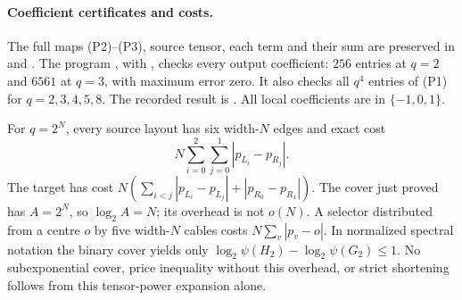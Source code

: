 \paragraph{Coefficient certificates and costs.}
The full maps (P2)--(P3), source tensor, each term and
their sum are preserved in
and .
The program ,
with ,
checks every output coefficient: $256$ entries at $q=2$
and $6561$ at $q=3$, with maximum error zero.
It also checks all $q^4$ entries of (P1) for
$q=2,3,4,5,8$.  The recorded result is
.
All local coefficients are in $\{-1,0,1\}$.

For $q=2^N$, every source layout has six width-$N$
edges and exact cost
\[
 N\sum_{i=0}^2\sum_{j=0}^1|p_{L_i}-p_{R_j}|.
\]
The target has cost
$N(\sum_{i<j}|p_{L_i}-p_{L_j}|+|p_{R_0}-p_{R_1}|)$.
The cover just proved has $A=2^N$, so $\log_2A=N$;
its overhead is not $o(N)$.  A selector distributed
from a centre $o$ by five width-$N$ cables costs
$N\sum_v|p_v-o|$.  In normalized spectral notation
the binary cover yields only
$\log_2\psi(H_2)-\log_2\psi(G_2)\le1$.
No subexponential cover, price inequality without this
overhead, or strict shortening follows from this
tensor-power expansion alone.

